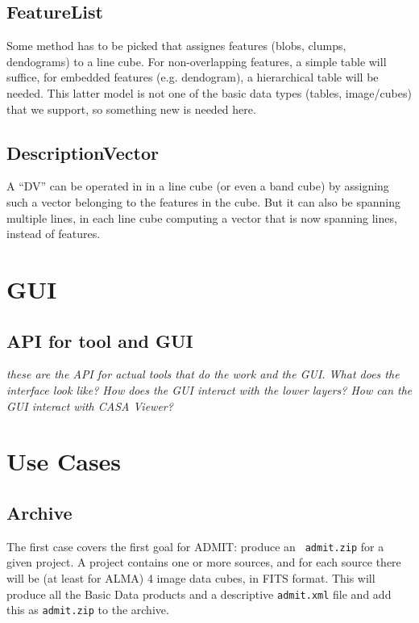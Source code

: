 \documentclass{article}
\begin{document}
\subsection{FeatureList}

Some method has to be picked that assignes features  (blobs, clumps, 
dendograms) to a line cube.  For non-overlapping features, a simple
table will suffice, for embedded features (e.g. dendogram),
a hierarchical table will be needed. This latter model is not one of
the basic data types (tables, image/cubes) that we support, so something
new is needed here.

\subsection{DescriptionVector}

A ``DV'' can be operated in in a line cube (or even a band cube) by assigning
such a vector belonging to the features in the cube. But it can also be
spanning multiple lines, in each line cube computing a vector that is now
spanning lines, instead of features.


\section{GUI}


\subsection{API for tool and GUI}

{\it these are the API for actual tools that do the
work and the GUI. What does the interface look like?
How does the GUI interact with the lower layers? How
can the GUI interact with CASA Viewer?}

\section{Use Cases}

\subsection{Archive}

The first case covers the first goal for ADMIT: produce an {\tt
  admit.zip} for a given project.  A project contains one or more
sources, and for each source there will be (at least for ALMA) 4 image
data cubes, in FITS format. This will produce all the Basic Data
products and a descriptive {\tt admit.xml} file and add this as 
{\tt admit.zip} to the archive.
\end{document}
